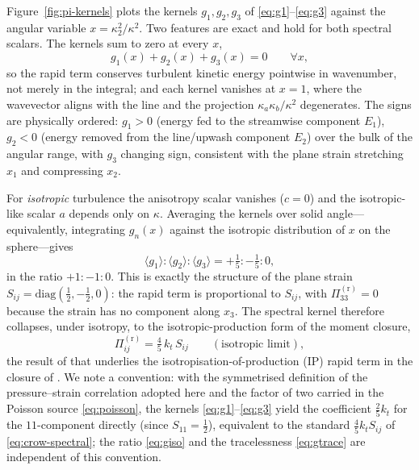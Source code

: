\documentclass[lineno]{JFM-FLM_Au}
\begin{document}
Figure~\ref{fig:pi-kernels} plots the kernels $g_1,g_2,g_3$ of
\eqref{eq:g1}--\eqref{eq:g3} against the angular variable
$x=\kappa_2^2/\kappa^2$. Two features are exact and hold for both spectral
scalars. The kernels sum to zero at every $x$,
\begin{equation}
  g_1(x)+g_2(x)+g_3(x)=0 \qquad \forall x,
  \label{eq:gtrace}
\end{equation}
so the rapid term conserves turbulent kinetic energy pointwise in wavenumber,
not merely in the integral; and each kernel vanishes at $x=1$, where the
wavevector aligns with the line and the projection $\kappa_a\kappa_b/\kappa^2$
degenerates. The signs are physically ordered: $g_1>0$ (energy fed to the
streamwise component $E_1$), $g_2<0$ (energy removed from the line/upwash
component $E_2$) over the bulk of the angular range, with $g_3$ changing sign,
consistent with the plane strain stretching $x_1$ and compressing $x_2$.

For \emph{isotropic} turbulence the anisotropy scalar vanishes ($c=0$) and the
isotropic-like scalar $a$ depends only on $\kappa$. Averaging the kernels over
solid angle---equivalently, integrating $g_n(x)$ against the isotropic
distribution of $x$ on the sphere---gives
\begin{equation}
  \langle g_1\rangle : \langle g_2\rangle : \langle g_3\rangle
  = +\tfrac15 : -\tfrac15 : 0,
  \label{eq:giso}
\end{equation}
in the ratio $+1:-1:0$. This is exactly the structure of the plane strain
$S_{ij}=\mathrm{diag}(\tfrac12,-\tfrac12,0)$: the rapid term is proportional to
$S_{ij}$, with $\Pi^{(\mathrm r)}_{33}=0$ because the strain has no component
along $x_3$. The spectral kernel therefore collapses, under isotropy, to the
isotropic-production form of the moment closure,
\begin{equation}
  \Pi^{(\mathrm r)}_{ij}
  = \tfrac{4}{5}\,k_t\,S_{ij}
  \qquad(\text{isotropic limit}),
  \label{eq:crow-spectral}
\end{equation}
the result of \citet{Crow1968} that underlies the isotropisation-of-production
(IP) rapid term in the closure of \citet{LaunderReeceRodi1975}. We note a
convention: with the symmetrised definition of the pressure--strain correlation
adopted here and the factor of two carried in the Poisson source
\eqref{eq:poisson}, the kernels \eqref{eq:g1}--\eqref{eq:g3} yield the
coefficient $\tfrac25 k_t$ for the $11$-component directly (since $S_{11}=\tfrac12$),
equivalent to the standard $\tfrac45 k_t S_{ij}$ of \eqref{eq:crow-spectral}; the ratio
\eqref{eq:giso} and the tracelessness \eqref{eq:gtrace} are independent of this
convention.
\end{document}
